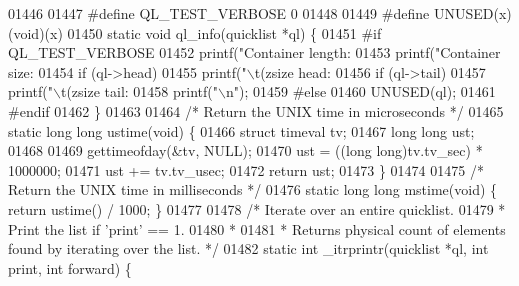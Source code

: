 \begin{DoxyCode}
{{{{{{{{{{{{{01446 
01447 \textcolor{preprocessor}{#}\textcolor{preprocessor}{define} \textcolor{preprocessor}{QL\_TEST\_VERBOSE} 0
01448 
01449 \textcolor{preprocessor}{#}\textcolor{preprocessor}{define} \textcolor{preprocessor}{UNUSED}\textcolor{preprocessor}{(}\textcolor{preprocessor}{x}\textcolor{preprocessor}{)} \textcolor{preprocessor}{(}\textcolor{preprocessor}{void}\textcolor{preprocessor}{)}\textcolor{preprocessor}{(}\textcolor{preprocessor}{x}\textcolor{preprocessor}{)}
01450 \textcolor{keyword}{static} \textcolor{keywordtype}{void} ql\_info(quicklist *ql) \{
01451 \textcolor{preprocessor}{#}\textcolor{preprocessor}{if} \textcolor{preprocessor}{QL\_TEST\_VERBOSE}
01452     printf(\textcolor{stringliteral}{"Container length: %
01453     printf(\textcolor{stringliteral}{"Container size: %
01454     \textcolor{keywordflow}{if} (ql->head)
01455         printf(\textcolor{stringliteral}{"\(\backslash\)t(zsize head: %
01456     \textcolor{keywordflow}{if} (ql->tail)
01457         printf(\textcolor{stringliteral}{"\(\backslash\)t(zsize tail: %
01458     printf(\textcolor{stringliteral}{"\(\backslash\)n"});
01459 \textcolor{preprocessor}{#}\textcolor{preprocessor}{else}
01460     UNUSED(ql);
01461 \textcolor{preprocessor}{#}\textcolor{preprocessor}{endif}
01462 \}
01463 
01464 \textcolor{comment}{/* Return the UNIX time in microseconds */}
01465 \textcolor{keyword}{static} \textcolor{keywordtype}{long} \textcolor{keywordtype}{long} ustime(\textcolor{keywordtype}{void}) \{
01466     \textcolor{keyword}{struct} timeval tv;
01467     \textcolor{keywordtype}{long} \textcolor{keywordtype}{long} ust;
01468 
01469     gettimeofday(&tv, NULL);
01470     ust = ((\textcolor{keywordtype}{long} \textcolor{keywordtype}{long})tv.tv\_sec) * 1000000;
01471     ust += tv.tv\_usec;
01472     \textcolor{keywordflow}{return} ust;
01473 \}
01474 
01475 \textcolor{comment}{/* Return the UNIX time in milliseconds */}
01476 \textcolor{keyword}{static} \textcolor{keywordtype}{long} \textcolor{keywordtype}{long} mstime(\textcolor{keywordtype}{void}) \{ \textcolor{keywordflow}{return} ustime() / 1000; \}
01477 
01478 \textcolor{comment}{/* Iterate over an entire quicklist.}
01479 \textcolor{comment}{ * Print the list if 'print' == 1.}
01480 \textcolor{comment}{ *}
01481 \textcolor{comment}{ * Returns physical count of elements found by iterating over the list. */}
01482 \textcolor{keyword}{static} \textcolor{keywordtype}{int} \_itrprintr(quicklist *ql, \textcolor{keywordtype}{int} print, \textcolor{keywordtype}{int} forward) \{
}}}}}}}}}}}}}}}}}
\end{DoxyCode}
